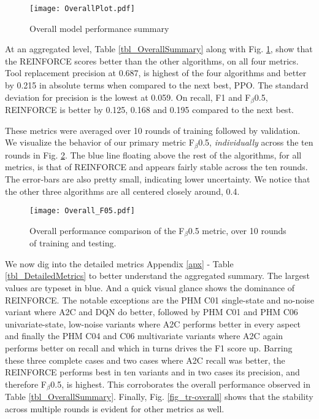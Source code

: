 \documentclass[referee, sn-mathphys-num]{sn-jnl}
\begin{document}
	\begin{figure}[hbt!]
		\centering
		\texttt{[image: OverallPlot.pdf]}  
		\caption{Overall model performance summary}
		\label{fig_OverallSummary}
	\end{figure}
	At an aggregated level, Table {\ref{tbl_OverallSummary}} along with Fig. {\ref{fig_OverallSummary}}, show that the REINFORCE scores better than the other algorithms, on all four metrics. Tool replacement precision at 0.687, is highest of the four algorithms and better by 0.215 in absolute terms when compared to the next best, PPO. The standard deviation for precision is the lowest at 0.059. On recall, F1 and F$_\beta$0.5, REINFORCE is better by 0.125, 0.168 and 0.195 compared to the next best.
	
	These metrics were averaged over 10 rounds of training followed by validation. We visualize the behavior of our primary metric F$_\beta$0.5, \textit{individually} across the ten rounds in Fig. {\ref{fig_FbetaOverall}}. The blue line floating above the rest of the algorithms, for all metrics, is that of REINFORCE and appears fairly stable across the ten rounds. The error-bars are also pretty small, indicating lower uncertainty. We notice that the other three algorithms are all centered closely around, 0.4.
	\begin{figure}[hbt!]
		\centering
		\texttt{[image: Overall\_F05.pdf]}  
		\caption{Overall performance comparison of the F$_\beta$0.5 metric, over 10 rounds of training and testing.}
		\label{fig_FbetaOverall}
	\end{figure}
	
	We now dig into the detailed metrics Appendix {\ref{apx}} - Table {\ref{tbl_DetailedMetrics}} to better understand the aggregated summary. The largest values are typeset in {\textcolor{dblue}{blue}}. And a quick visual glance shows the dominance of REINFORCE. The notable exceptions are the PHM C01 single-state and no-noise variant where A2C and DQN do better, followed by PHM C01 and PHM C06 univariate-state, low-noise variants where A2C performs better in every aspect and finally the PHM C04 and C06 multivariate variants where A2C again performs better on recall and which in turns drives the F1 score up. Barring these three complete cases and two cases where A2C recall was better, the REINFORCE performs best in ten variants and in two cases its precision, and therefore F$_\beta$0.5, is highest. This corroborates the overall performance observed in Table {\ref{tbl_OverallSummary}}. Finally, Fig. {\ref{fig_tr-overall}} shows that the stability across multiple rounds is evident for other metrics as well.
	
\end{document}
